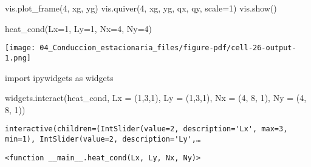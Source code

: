 \documentclass[
  letterpaper,
  DIV=11,
  numbers=noendperiod]{scrreprt}
\newenvironment{Shaded}{\begin{snugshade}}{\end{snugshade}}
\newcommand{\DecValTok}[1]{\textcolor[rgb]{0.68,0.00,0.00}{#1}}
\newcommand{\ImportTok}[1]{\textcolor[rgb]{0.00,0.46,0.62}{#1}}
\newcommand{\NormalTok}[1]{\textcolor[rgb]{0.00,0.23,0.31}{#1}}
\newcommand{\OperatorTok}[1]{\textcolor[rgb]{0.37,0.37,0.37}{#1}}
\begin{document}
\begin{Shaded}
\begin{Highlighting}[]
\NormalTok{    vis.plot\_frame(}\DecValTok{4}\NormalTok{, xg, yg)}
\NormalTok{    vis.quiver(}\DecValTok{4}\NormalTok{, xg, yg, qx, qy, scale}\OperatorTok{=}\DecValTok{1}\NormalTok{)}
\NormalTok{    vis.show()}
\end{Highlighting}
\end{Shaded}

\begin{Shaded}
\begin{Highlighting}[]
\NormalTok{heat\_cond(Lx}\OperatorTok{=}\DecValTok{1}\NormalTok{, Ly}\OperatorTok{=}\DecValTok{1}\NormalTok{, Nx}\OperatorTok{=}\DecValTok{4}\NormalTok{, Ny}\OperatorTok{=}\DecValTok{4}\NormalTok{)}
\end{Highlighting}
\end{Shaded}

\texttt{[image: 04\_Conduccion\_estacionaria\_files/figure-pdf/cell-26-output-1.png]}

\begin{Shaded}
\begin{Highlighting}[]
\ImportTok{import}\NormalTok{ ipywidgets }\ImportTok{as}\NormalTok{ widgets}
\end{Highlighting}
\end{Shaded}

\begin{Shaded}
\begin{Highlighting}[]
\NormalTok{widgets.interact(heat\_cond, Lx }\OperatorTok{=}\NormalTok{ (}\DecValTok{1}\NormalTok{,}\DecValTok{3}\NormalTok{,}\DecValTok{1}\NormalTok{), Ly }\OperatorTok{=}\NormalTok{ (}\DecValTok{1}\NormalTok{,}\DecValTok{3}\NormalTok{,}\DecValTok{1}\NormalTok{), Nx }\OperatorTok{=}\NormalTok{ (}\DecValTok{4}\NormalTok{, }\DecValTok{8}\NormalTok{, }\DecValTok{1}\NormalTok{), Ny }\OperatorTok{=}\NormalTok{ (}\DecValTok{4}\NormalTok{, }\DecValTok{8}\NormalTok{, }\DecValTok{1}\NormalTok{))}
\end{Highlighting}
\end{Shaded}

\begin{verbatim}
interactive(children=(IntSlider(value=2, description='Lx', max=3, min=1), IntSlider(value=2, description='Ly',…
\end{verbatim}

\begin{verbatim}
<function __main__.heat_cond(Lx, Ly, Nx, Ny)>
\end{verbatim}

\end{document}

